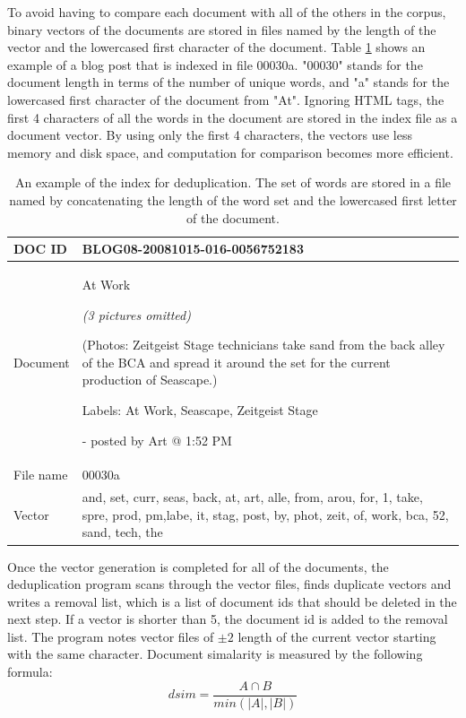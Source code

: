 \documentclass{sig-alternate}
\begin{document}
To avoid having to compare each document with all of the others in the corpus, binary vectors of the documents are stored in files named by the length of the vector and the lowercased first character of the document. Table \ref{table:dedup} shows an example of a blog post that is indexed in file 00030a. "00030" stands for the document length in terms of the number of unique words, and "a" stands for the lowercased first character of the document from "At". Ignoring HTML tags, the first 4 characters of all the words in the document are stored in the index file as a document vector. By using only the first 4 characters, the vectors use less memory and disk space, and computation for comparison becomes more efficient.

\begin{table}[h!t!]
\begin{center}
\begin{tabular}{l|p{6.0cm}}

\hline
DOC ID & BLOG08-20081015-016-0056752183\\ 

\hline
Document & 

At Work


\emph{(3 pictures omitted)}



(Photos: Zeitgeist Stage technicians take sand from the back alley of the BCA and spread it around the set for the current production of Seascape.)

Labels: At Work, Seascape, Zeitgeist Stage


- posted by Art @ 1:52 PM\\
\hline
File name& 00030a\\
\hline
Vector & and, set, curr, seas, back, at, art, alle, from, arou, for, 1, take, spre, prod, pm,labe, it, stag, post, by, phot, zeit, of, work, bca, 52, sand, tech, the\\

\hline
\end{tabular}
\caption{An example of the index for deduplication. The set of words are stored in a file named by concatenating the length of the word set and the lowercased first letter of the document.}
\label{table:dedup}
\end{center}
\end{table}

Once the vector generation is completed for all of the documents, the deduplication program scans through the vector files, finds duplicate vectors and writes a removal list, which is a list of document ids that should be deleted in the next step. If a vector is shorter than 5, the document id is added to the removal list. The program notes vector files of $\pm 2$ length of the current vector starting with the same character. Document simalarity is measured by the following formula:
\begin{displaymath}
dsim=\frac{A \cap B}  {min(|A|, |B|)}
\end{displaymath}
\end{document}
